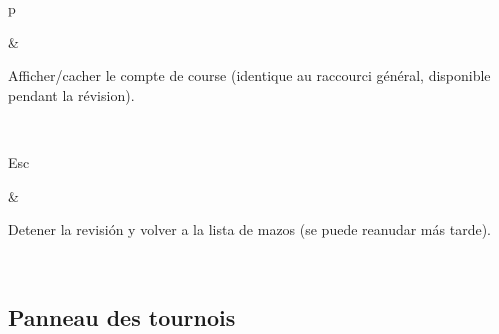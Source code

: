 \documentclass[letterpaper,10pt,spanish]{sphinxmanual}
\begin{document}
\begin{savenotes}
\begin{tabular}[t]{}
\begin{varwidth}[t]{}
p
\sphinxbeforeendvarwidth
\end{varwidth}%
&\begin{varwidth}[t]{}
\sphinxAtStartPar
Afficher/cacher le compte de course (identique au raccourci général, disponible pendant la révision).
\sphinxbeforeendvarwidth
\end{varwidth}%
\\
\sphinxhline\begin{varwidth}[t]{}
\sphinxAtStartPar
Esc
\sphinxbeforeendvarwidth
\end{varwidth}%
&\begin{varwidth}[t]{}
\sphinxAtStartPar
Detener la revisión y volver a la lista de mazos (se puede reanudar más tarde).
\sphinxbeforeendvarwidth
\end{varwidth}%
\\
\sphinxbottomrule
\end{tabular}
\sphinxtableafterendhook\par
\sphinxattableend\end{savenotes}


\subsection{Panneau des tournois}
\label{\detokenize{raccourcis:panneau-des-tournois}}\label{\detokenize{raccourcis:raccourcis-tournament-panel}}
\end{document}
